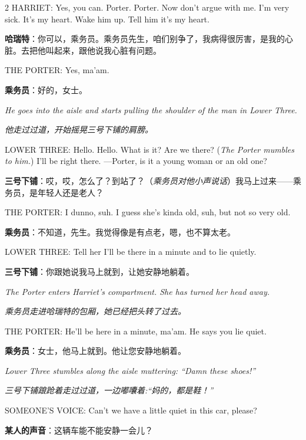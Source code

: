 \documentclass[lang=cn,newtx,10pt,scheme=chinese]{elegantbook}
\newcommand{\pair}[2]{%
\switchcolumn* #2\par
\switchcolumn  #1\par
}
\begin{document}
\begin{paracol}{2}
\pair{
    \textbf{哈瑞特}：你可以，乘务员。乘务员先生，咱们别争了，我病得很厉害，是我的心脏。去把他叫起来，跟他说我心脏有问题。
}{
    HARRIET: Yes, you can. Porter. Porter. Now don't argue with me. I'm very sick. It's my heart. Wake him up. Tell him it's my heart.
}

\pair{
    \textbf{乘务员}：好的，女士。
}{
    THE PORTER: Yes, ma'am.
    \newline
    \newline
}

\pair{
    \textit{他走过过道，开始摇晃三号下铺的肩膀。}
}{
    \textit{He goes into the aisle and starts pulling the shoulder of the man in Lower Three.}
    \newline
    \newline
}

\pair{
    \textbf{三号下铺}：哎，哎，怎么了？到站了？（\textit{乘务员对他小声说话}）我马上过来——乘务员，是年轻人还是老人？
}{
    LOWER THREE: Hello. Hello. What is it? Are we there? (\textit{The Porter mumbles to him.}) I'll be right there. —Porter, is it a young woman or an old one?
}

\pair{
    \textbf{乘务员}：不知道，先生。我觉得像是有点老，嗯，也不算太老。
}{
    THE PORTER: I dunno, suh. I guess she's kinda old, suh, but not so very old.
}

\pair{
    \textbf{三号下铺}：你跟她说我马上就到，让她安静地躺着。
}{
    LOWER THREE: Tell her I'll be there in a minute and to lie quietly.
    \newline
    \newline
}

\pair{
    \textit{乘务员走进哈瑞特的包厢，她已经把头转了过去。}
}{
    \textit{The Porter enters Harriet's compartment. She has turned her head away.}
    \newline
    \newline
}

\pair{
    \textbf{乘务员}：女士，他马上就到。他让您安静地躺着。
}{
    THE PORTER: He'll be here in a minute, ma'am. He says you lie quiet.
    \newline
    \newline
}

\pair{
    \textit{三号下铺踉跄着走过过道，一边嘟囔着:“妈的，都是鞋！”}
}{
    \textit{Lower Three stumbles along the aisle muttering: “Damn these shoes!”}
    \newline
    \newline
}

\pair{
    \textbf{某人的声音}：这辆车能不能安静一会儿？
}{
    SOMEONE'S VOICE: Can't we have a little quiet in this car, please?
}


\end{paracol}
\end{document}
